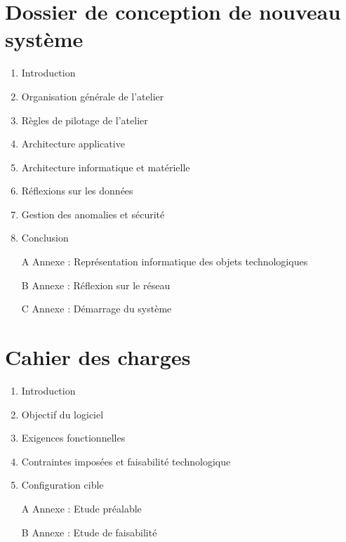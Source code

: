 \section[CNS]{Dossier de conception de nouveau système}

\begin{enumerate}
\item Introduction
\item Organisation générale de l'atelier
\item Règles de pilotage de l'atelier
\item Architecture applicative
\item Architecture informatique et matérielle
\item Réflexions sur les données
\item Gestion des anomalies et sécurité
\item Conclusion
\item[A]{Annexe : Représentation informatique des objets technologiques}
\item[B]{Annexe : Réflexion sur le réseau}
\item[C]{Annexe : Démarrage du système}
\end{enumerate}

\section[CDC]{Cahier des charges}

\begin{enumerate}
\item Introduction
\item Objectif du logiciel
\item Exigences fonctionnelles
\item Contraintes imposées et faisabilité technologique
\item Configuration cible
\item[A]{Annexe : Etude préalable}
\item[B]{Annexe : Etude de faisabilité}
\end{enumerate}
